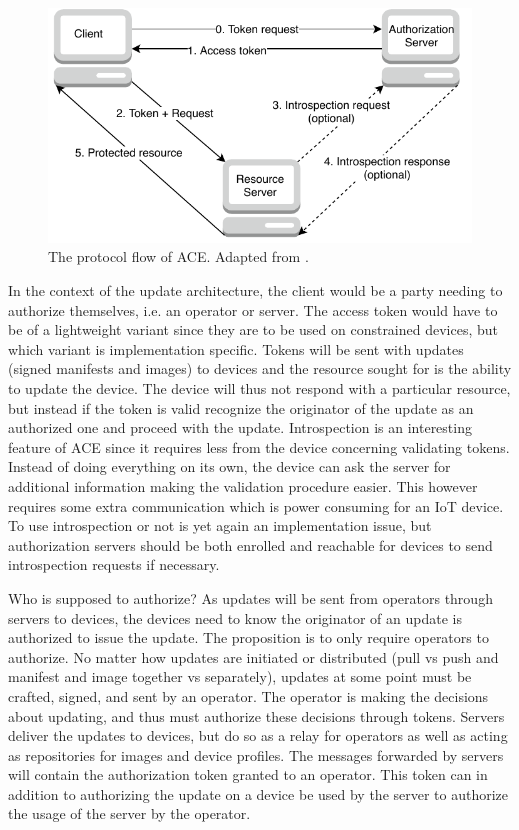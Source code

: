\documentclass[0-thesis.tex]{subfiles}
\begin{document}
\begin{figure}
    \caption{The protocol flow of ACE. Adapted from \parencite{ace}.}
    \label{fig:ace-flow}
    \includegraphics{images/ace.pdf}
\end{figure}

In the context of the update architecture, the client would be a party needing to
authorize themselves, i.e. an operator or server. The access token would have to be of a
lightweight variant since they are to be used on constrained devices, but which variant is
implementation specific. Tokens will be sent with updates (signed manifests and images) to
devices and the resource sought for is the ability to update the device. The device will
thus not respond with a particular resource, but instead if the token is valid recognize
the originator of the update as an authorized one and proceed with the update.
Introspection is an interesting feature of ACE since it requires less from the device
concerning validating tokens. Instead of doing everything on its own, the device can ask
the server for additional information making the validation procedure easier. This however
requires some extra communication which is power consuming for an IoT device. To use
introspection or not is yet again an implementation issue, but authorization servers
should be both enrolled and reachable for devices to send introspection requests if
necessary.

Who is supposed to authorize? As updates will be sent from operators through servers to
devices, the devices need to know the originator of an update is authorized to issue the
update. The proposition is to only require operators to authorize. No matter how updates
are initiated or distributed (pull vs push and manifest and image together vs separately),
updates at some point must be crafted, signed, and sent by an operator. The operator is
making the decisions about updating, and thus must authorize these decisions through
tokens. Servers deliver the updates to devices, but do so as a relay for operators as
well as acting as repositories for images and device profiles. The messages forwarded by
servers will contain the authorization token granted to an operator. This token can in
addition to authorizing the update on a device be used by the server to authorize the
usage of the server by the operator. 
\end{document}
